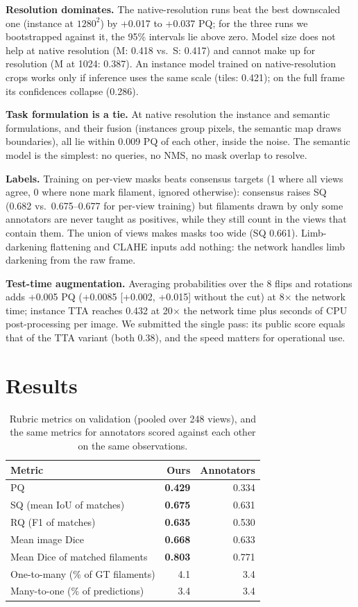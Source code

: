 \documentclass[sigconf]{acmart}
\begin{document}
\textbf{Resolution dominates.} The native-resolution runs beat the best downscaled one (instance at $1280^2$) by +0.017 to +0.037 PQ; for the three runs we bootstrapped against it, the 95\% intervals lie above zero. Model size does not help at native resolution (M: 0.418 vs.\ S: 0.417) and cannot make up for resolution (M at 1024: 0.387). An instance model trained on native-resolution crops works only if inference uses the same scale (tiles: 0.421); on the full frame its confidences collapse (0.286).

\textbf{Task formulation is a tie.} At native resolution the instance and semantic formulations, and their fusion (instances group pixels, the semantic map draws boundaries), all lie within 0.009 PQ of each other, inside the noise. The semantic model is the simplest: no queries, no NMS, no mask overlap to resolve.

\textbf{Labels.} Training on per-view masks beats consensus targets (1 where all views agree, 0 where none mark filament, ignored otherwise): consensus raises SQ (0.682 vs.\ 0.675--0.677 for per-view training) but filaments drawn by only some annotators are never taught as positives, while they still count in the views that contain them. The union of views makes masks too wide (SQ 0.661). Limb-darkening flattening and CLAHE inputs add nothing: the network handles limb darkening from the raw frame.

\textbf{Test-time augmentation.} Averaging probabilities over the 8 flips and rotations adds +0.005 PQ (+0.0085 [+0.002, +0.015] without the cut) at 8$\times$ the network time; instance TTA reaches 0.432 at 20$\times$ the network time plus seconds of CPU post-processing per image. We submitted the single pass: its public score equals that of the TTA variant (both 0.38), and the speed matters for operational use.

\section{Results}

\begin{table}[t]
\caption{Rubric metrics on validation (pooled over 248 views), and the same metrics for annotators scored against each other on the same observations.}
\label{tab:rubric}
\small
\begin{tabular}{@{}lrr@{}}
\toprule
Metric & Ours & Annotators \\
\midrule
PQ & \textbf{0.429} & 0.334 \\
SQ (mean IoU of matches) & \textbf{0.675} & 0.631 \\
RQ (F1 of matches) & \textbf{0.635} & 0.530 \\
Mean image Dice & \textbf{0.668} & 0.633 \\
Mean Dice of matched filaments & \textbf{0.803} & 0.771 \\
One-to-many (\% of GT filaments) & 4.1 & 3.4 \\
Many-to-one (\% of predictions) & 3.4 & 3.4 \\
\bottomrule
\end{tabular}
\end{table}
\end{document}

